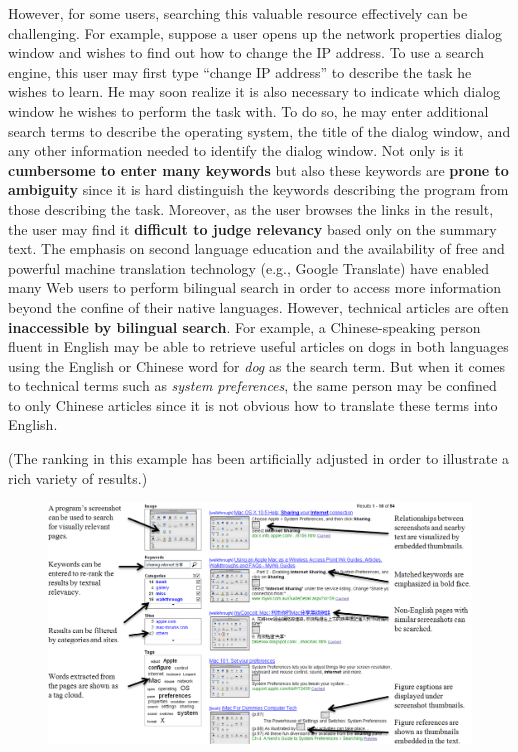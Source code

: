 \documentclass{www2010-submission}
\begin{document}
However, for some users, searching this valuable resource
effectively can be challenging. For example, suppose a user opens
up the network properties dialog window and wishes to find out how
to change the IP address. To use a search engine, this user may
first type ``change IP address'' to describe the task he wishes to
learn. He may soon realize it is also necessary to indicate which
dialog window he wishes to perform the task with. To do so, he may
enter additional search terms to describe the operating system,
the title of the dialog window, and any other information needed
to identify the dialog window. Not only is it \textbf{cumbersome
to enter many keywords} but also these keywords are \textbf{prone
to ambiguity} since it is hard distinguish the keywords describing
the program from those describing the task. Moreover, as the user
browses the links in the result, the user may find it
\textbf{difficult to judge relevancy} based only on the summary
text. The emphasis on second language education and the
availability of free and powerful machine translation technology
(e.g., Google Translate) have enabled many Web users to perform
bilingual search in order to access more information beyond the
confine of their native languages. However, technical articles are
often \textbf{inaccessible by bilingual search}. For example, a
Chinese-speaking person fluent in English may be able to retrieve
useful articles on dogs in both languages using the English or
Chinese word for \emph{dog} as the search term. But when it comes
to technical terms such as \emph{system preferences}, the same
person may be confined to only Chinese articles since it is not
obvious how to translate these terms into English.




(The ranking in this example has been artificially adjusted in
order to illustrate a rich variety of results.)

\begin{figure}
\includegraphics[width=2\columnwidth]{figure/main_result.png}
\end{figure}
\end{document}
